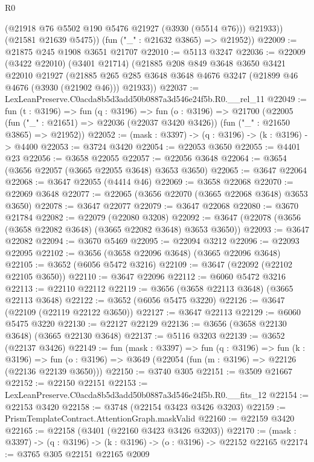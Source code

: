 \begin{lexlean}{R0}
\begin{coremodule}
            (@21918 @76 @5502 @190 @5476 @21927 (@3930 (@5514 @76)))
            @21933))
        (@21581 @21639 @5475))
      (fun ("_" : @21632 @3865) => @21952))
@22009 := @21875 @245 @1908 @3651 @21707
@22010 := @5113 @3247
@22036 := @22009
    (@3422 @22010)
    (@3401 @21714)
    (@21885
      @208
      @849
      @3648
      @3650
      @3421
      @22010
      @21927
      (@21885 @265 @285 @3648 @3648 @4676 @3247 (@21899 @46 @4676 (@3930 (@21902 @46))) @21933))
@22037 := LexLeanPreserve.C0acda8b5d3add50b0887a3d546e24f5b.R0.__rel_11
@22049 := fun (t : @3196) =>
  fun (q : @3196) =>
  fun (o : @3196) =>
  @21700
    (@22005
      (fun ("_" : @21651) => @22036 (@22037 @3420 @3426))
      (fun ("_" : @21650 @3865) => @21952))
@22052 := (mask : @3397) -> (q : @3196) -> (k : @3196) -> @4400
@22053 := @3724 @3420
@22054 := @22053 @3650
@22055 := @4401 @23
@22056 := @3658 @22055
@22057 := @22056 @3648
@22064 := @3654 (@3656 @22057 (@3665 @22055 @3648) @3653 @3650)
@22065 := @3647 @22064
@22068 := @3647 @22055 (@4414 @46)
@22069 := @3658 @22068
@22070 := @22069 @3648
@22077 := @22065 (@3656 @22070 (@3665 @22068 @3648) @3653 @3650)
@22078 := @3647 @22077
@22079 := @3647 @22068
@22080 := @3670 @21784
@22082 := @22079 (@22080 @3208)
@22092 := @3647 (@22078 (@3656 (@3658 @22082 @3648) (@3665 @22082 @3648) @3653 @3650))
@22093 := @3647 @22082
@22094 := @3670 @5469
@22095 := @22094 @3212
@22096 := @22093 @22095
@22102 := @3656 (@3658 @22096 @3648) (@3665 @22096 @3648)
@22105 := @3652 (@6056 @5472 @3216)
@22109 := @3647 (@22092 (@22102 @22105 @3650))
@22110 := @3647 @22096
@22112 := @6060 @5472 @3216
@22113 := @22110 @22112
@22119 := @3656 (@3658 @22113 @3648) (@3665 @22113 @3648)
@22122 := @3652 (@6056 @5475 @3220)
@22126 := @3647 (@22109 (@22119 @22122 @3650))
@22127 := @3647 @22113
@22129 := @6060 @5475 @3220
@22130 := @22127 @22129
@22136 := @3656 (@3658 @22130 @3648) (@3665 @22130 @3648)
@22137 := @5116 @3203
@22139 := @3652 (@22137 @3426)
@22149 := fun (mask : @3397) =>
  fun (q : @3196) =>
  fun (k : @3196) =>
  fun (o : @3196) => @3649 (@22054 (fun (m : @3196) => @22126 (@22136 @22139 @3650)))
@22150 := @3740 @305
@22151 := @3509 @21667
@22152 := @22150 @22151
@22153 := LexLeanPreserve.C0acda8b5d3add50b0887a3d546e24f5b.R0.__fits_12
@22154 := @22153 @3420
@22158 := @3748 (@22154 @3423 @3426 @3203)
@22159 := PrismTemplateContract.AttentionGraph.maskValid
@22160 := @22159 @3420
@22165 := @22158 (@3401 (@22160 @3423 @3426 @3203))
@22170 := (mask : @3397) -> (q : @3196) -> (k : @3196) -> (o : @3196) -> @22152 @22165
@22174 := @3765 @305 @22151 @22165 @2009

\end{coremodule}
\end{lexlean}
